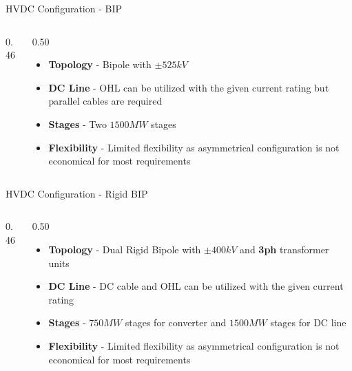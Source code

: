 \begin{frame}{HVDC Configuration - BIP}
  \begin{columns}[c,onlytextwidth]
    \begin{column}{0.46\textwidth}
      \centering
    \end{column}
    \begin{column}{0.50\textwidth}
      \vspace{0.5em}
      \begin{itemize}
        \setlength{\itemsep}{0.7em}
        \item \textbf{Topology} - Bipole with $\pm525kV$
        \item \textbf{DC Line} - OHL can be utilized with the given current rating but parallel cables are required
        \item \textbf{Stages} - Two $1500MW$ stages
        \item \textbf{Flexibility} - Limited flexibility as asymmetrical configuration is not economical for most requirements
      \end{itemize}
    \end{column}
  \end{columns}
\end{frame}


\begin{frame}{HVDC Configuration - Rigid BIP}
  \begin{columns}[c,onlytextwidth]
    \begin{column}{0.46\textwidth}
      \centering
    \end{column}
    \begin{column}{0.50\textwidth}
      \vspace{0.5em}
      \begin{itemize}
        \setlength{\itemsep}{0.7em}
        \item \textbf{Topology} - Dual Rigid Bipole with $\pm400kV$ and \textbf{3ph} transformer units
        \item \textbf{DC Line} - DC cable and OHL can be utilized with the given current rating
        \item \textbf{Stages} - $750MW$ stages for converter and $1500MW$ stages for DC line
        \item \textbf{Flexibility} - Limited flexibility as asymmetrical configuration is not economical for most requirements
      \end{itemize}
    \end{column}
  \end{columns}
\end{frame}


